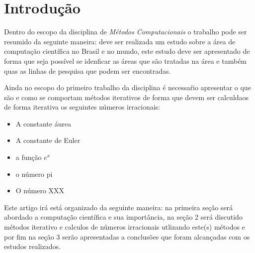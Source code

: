 \section*{Introdução}

	Dentro do escopo da disciplina de \emph{Métodos Computacionais} o trabalho
	pode ser resumido da seguinte maneira: deve ser realizada um estudo sobre a
	área de computação científica no Brasil e no mundo, este estudo deve ser
	apresentado de forma que seja possível se idenficar as áreas que são
	tratadas na área e também quas as linhas de pesquisa que podem ser
	encontradas.

	Ainda no escopo do primeiro trabalho da disciplina é necessaŕio apresentar o
	que são e como se comportam métodos iterativos de forma que devem ser
	calculdaos de forma iterativa os seguintes números irracionais:

	\begin{itemize}
		\item A constante áurea
		\item A constante de Euler
		\item a função $e^x$
		\item o número pi
		\item O número XXX
	\end{itemize}

	Este artigo irá está organizado da seguinte maneira: na primeira seção será
	abordado a computação científica e sua importância, na seção 2 será
	discutido métodos iterativo e calculos de números irracionais utlizando
	este(s) métodos e por fim na seção 3 serão apresentadas a conclusões que
	foram alcançadas com os estudos realizados.
